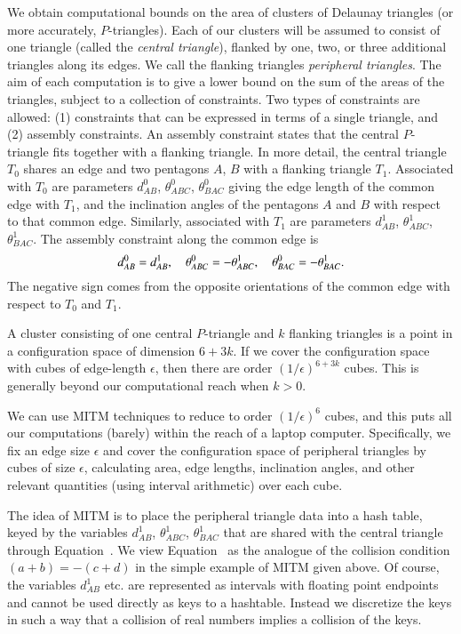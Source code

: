 We obtain computational bounds on the area of clusters of Delaunay
triangles (or more accurately, $P$-triangles).  Each of our clusters
will be assumed to consist of one triangle (called the {\it central
triangle}), flanked by one, two, or three additional triangles along
its edges.  We call the flanking triangles {\it peripheral triangles}.
The aim of each computation is to give a lower bound on the sum of the
areas of the triangles, subject to a collection of constraints.  Two
types of constraints are allowed: (1) constraints that can be
expressed in terms of a single triangle, and (2) assembly constraints.
An assembly constraint states that the central $P$-triangle fits
together with a flanking triangle.  In more detail, the central
triangle $T_0$ shares an edge and two pentagons $A$, $B$ with a
flanking triangle $T_1$.  Associated with $T_0$ are parameters
$d^0_{AB}$, $\theta^0_{ABC}$, $\theta^0_{BAC}$ giving the edge length
of the common edge with $T_1$, and the inclination angles of the
pentagons $A$ and $B$ with respect to that common edge.  Similarly,
associated with $T_1$ are parameters $d^1_{AB}$, $\theta^1_{ABC}$,
$\theta^1_{BAC}$.  The assembly constraint along the common edge is
\begin{equation}\libel{eqn:assembly}
d^0_{AB} = d^1_{AB},\quad 
\theta^0_{ABC} = -\theta^1_{ABC},\quad \theta^0_{BAC} = -\theta^1_{BAC}.
\end{equation}
The negative sign comes from the opposite orientations of the common
edge with respect to $T_0$ and $T_1$.

A cluster consisting of one central $P$-triangle and $k$ flanking
triangles is a point in a configuration space of dimension $6 + 3k$.
If we cover the configuration space with cubes of edge-length
$\epsilon$, then there are order $(1/\epsilon)^{6+3k}$ cubes.  This is
generally beyond our computational reach when $k>0$.

We can use MITM techniques to reduce to order $(1/\epsilon)^6$ cubes,
and this puts all our computations (barely) within the reach of a
laptop computer.  Specifically, we fix an edge size $\epsilon$ and
cover the configuration space of peripheral triangles by cubes of size
$\epsilon$, calculating area, edge lengths, inclination angles, and
other relevant quantities (using interval arithmetic) over each cube.

The idea of MITM is to place the peripheral triangle data into a hash
table, keyed by the variables $d^1_{AB}$, $\theta^1_{ABC}$,
$\theta^1_{BAC}$ that are shared with the central triangle through
Equation~.  We view Equation~ as
the analogue of the collision condition $(a+b) = -(c+d)$ in the simple
example of MITM given above.  Of course, the variables $d^1_{AB}$
etc. are represented as intervals with floating point endpoints and
cannot be used directly as keys to a hashtable.  Instead we discretize
the keys in such a way that a collision of real numbers implies a
collision of the keys.

